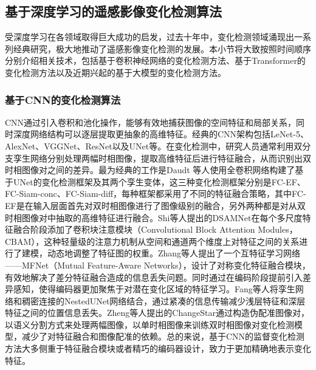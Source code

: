 \documentclass[lang=chs, degree=master, blindreview=false, adobe=false]{yanputhesis}
\begin{document}
\subsection{基于深度学习的遥感影像变化检测算法}
受深度学习在各领域取得巨大成功的启发，过去十年中，变化检测领域涌现出一系列经典研究，极大地推动了遥感影像变化检测的发展。本小节将大致按照时间顺序分别介绍相关技术，包括基于卷积神经网络的变化检测方法、基于Transformer的变化检测方法以及近期兴起的基于大模型的变化检测方法。
\subsubsection{基于CNN的变化检测算法}
CNN通过引入卷积和池化操作，能够有效地捕获图像的空间特征和局部关系，同时深度网络结构可以逐层提取更抽象的高维特征。经典的CNN架构包括LeNet-5\cite{lecun1998lenet}、AlexNet\cite{krizhevsky2012alexnet}、VGGNet\cite{simonyan2014VGG}、ResNet\cite{He2015ResNet}以及UNet\cite{ronneberger2015Unet}等。在变化检测中，研究人员通常利用双分支孪生网络分别处理两幅时相图像，提取高维特征后进行特征融合，从而识别出双时相图像对之间的差异。最为经典的工作是Daudt 等人\cite{daudt2018FC-EF}使用全卷积网络构建了基于UNet的变化检测框架及其两个孪生变体，这三种变化检测框架分别是FC-EF、FC-Siam-conc、FC-Siam-diff，每种框架都采用了不同的特征融合策略，其中FC-EF是在输入层面首先对双时相图像进行了图像级别的融合，另外两种都是对从双时相图像对中抽取的高维特征进行融合。Shi等人\cite{shi2021DSAMNet}提出的DSAMNet在每个多尺度特征融合阶段添加了卷积块注意模块\cite{woo2018cbam}（Convolutional Block Attention Modules，CBAM），这种轻量级的注意力机制从空间和通道两个维度上对特征之间的关系进行了建模，动态地调整了特征图的权重。Zhang等人\cite{zhang2023MFNet}提出了一个互特征学习网络——MFNet（Mutual Feature-Aware Networks），设计了对称变化特征融合模块，有效地解决了差分特征融合造成的信息丢失问题。同时通过在编码阶段提前引入差异感知，使得编码器更加聚焦于对潜在变化区域的特征学习。Fang等人\cite{fang2021SNUNet}将孪生网络和稠密连接的NestedUNet网络\cite{zhou2018unet++}结合，通过紧凑的信息传输减少浅层特征和深层特征之间的位置信息丢失。Zheng等人提出的ChangeStar\cite{zheng2021changestar}通过构造伪配准图像对，以语义分割方式来处理两幅图像，以单时相图像来训练双时相图像对变化检测模型，减少了对特征融合和图像配准的依赖。总的来说，基于CNN的监督变化检测方法大多侧重于特征融合模块或者精巧的编码器设计，致力于更加精确地表示变化特征。
\end{document}
